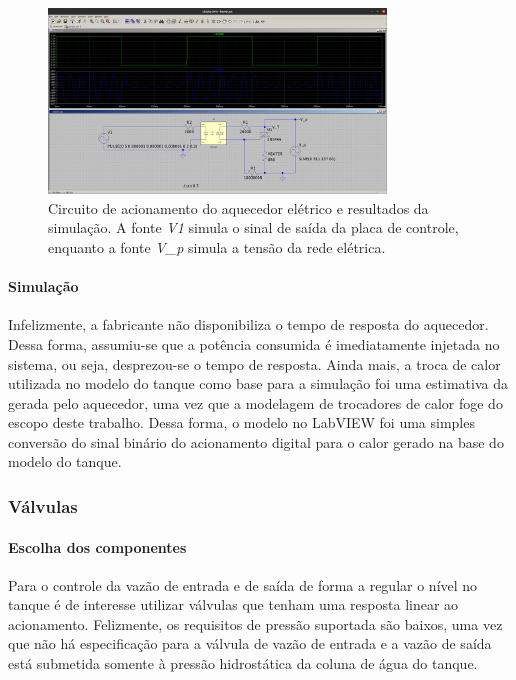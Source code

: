 \begin{figure}[H]
    \centering
    \includegraphics[width=0.8\textwidth]{imagens/heater_circ.png}
    \caption{Circuito de acionamento do aquecedor elétrico e resultados da simulação. A fonte \emph{V1} simula o sinal de saída da placa de controle, enquanto a fonte \emph{V\_p} simula a tensão da rede elétrica.}
    \label{fig:imagens-heater_circ-png}
\end{figure}

\paragraph{Simulação}\mbox{}

Infelizmente, a fabricante não disponibiliza o tempo de resposta do aquecedor. Dessa forma, assumiu-se que a potência consumida é imediatamente injetada no sistema, ou seja, desprezou-se o tempo de resposta. Ainda mais, a troca de calor utilizada no modelo do tanque como base para a simulação foi uma estimativa da gerada pelo aquecedor, uma vez que a modelagem de trocadores de calor foge do escopo deste trabalho. Dessa forma, o modelo no LabVIEW foi uma simples conversão do sinal binário do acionamento digital para o calor gerado na base do modelo do tanque.

\subsubsection{Válvulas}

\paragraph{Escolha dos componentes}\mbox{}

Para o controle da vazão de entrada e de saída de forma a regular o nível no tanque é de interesse utilizar válvulas que tenham uma resposta linear ao acionamento. Felizmente, os requisitos de pressão suportada são baixos, uma vez que não há especificação para a válvula de vazão de entrada e a vazão de saída está submetida somente à pressão hidrostática da coluna de água do tanque.

